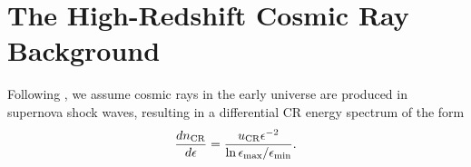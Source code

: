 
\section{The High-Redshift Cosmic Ray Background}
\label{crb}
Following \citet{StacyBromm2007}, we assume cosmic rays in the early universe are produced in supernova shock waves, resulting in a differential CR energy spectrum of the form
\begin{equation}
\frac{dn_{\rm \tiny CR}}{d\epsilon} = \frac{u_{\rm \small CR} \epsilon^{-2}}{{\rm ln}\,\epsilon_{\rm max}{\large /}\epsilon_{\rm min}}.
\end{equation}
